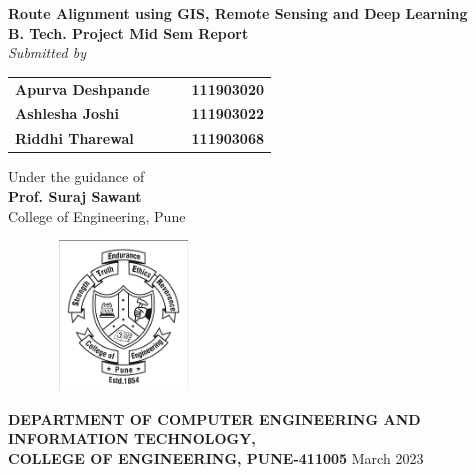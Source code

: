 \begin{titlepage}
\begin{center}
\LARGE{\bf{Route Alignment using GIS, Remote Sensing and Deep Learning\\}}	%
\Large{\bf{ B. Tech. Project Mid Sem Report\\}}		%
\Large{\em{Submitted by\\}}
\begin{table}[htbp]
	\begin{center}
	\begin{tabular}{ l c c l }
	\Large\bf{Apurva Deshpande} & & & \Large\bf{111903020} \\[0.3cm] 
	\Large\bf{Ashlesha Joshi} & & & \Large\bf{111903022} \\[0.3cm]
	\Large\bf{Riddhi Tharewal} & & & \Large\bf{111903068} \\
	\end{tabular}
	\end{center}
	\end{table}

\Large{Under the guidance of\\ }
\Large{\bf{Prof. Suraj Sawant }\\}
\Large{College of Engineering, Pune\\}
\begin{figure}[h]
\centering
\includegraphics[width=4cm,height=4cm]{COEP_logo.jpeg}
\end{figure}


\Large{\bf{DEPARTMENT OF COMPUTER ENGINEERING AND \\INFORMATION TECHNOLOGY,\\ 
COLLEGE OF ENGINEERING, PUNE-411005}}
\vfill
\large{March 2023}
\end{center}
\end{titlepage}
